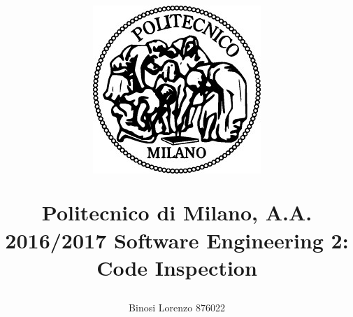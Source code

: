


\title
{
	\begin{figure}[h]
		\centering
		\includegraphics{images/polimi_logo}
	\end{figure}
	Politecnico di Milano, A.A. 2016/2017 
	\newline\newline 
	Software Engineering 2: Code Inspection
}
\author{Binosi Lorenzo 876022}	
	

	
	\maketitle
	\tableofcontents
	\newpage
	
	
	
	
	
	
	
